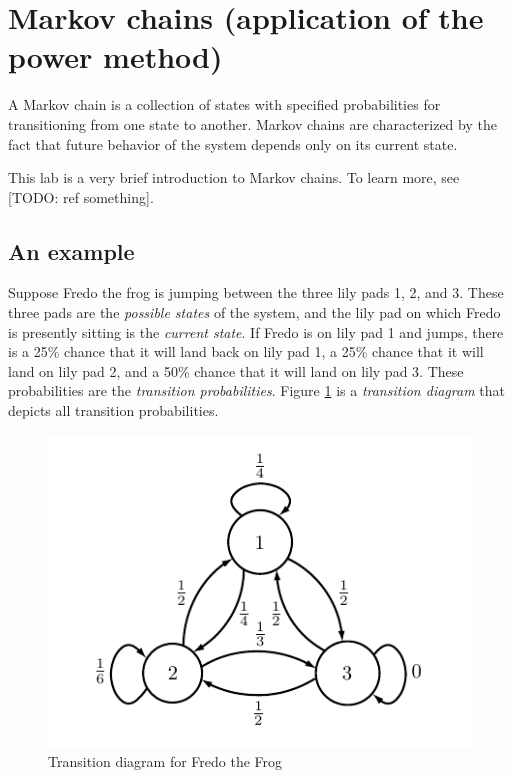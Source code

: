 \section*{Markov chains (application of the power method)}
A Markov chain is a collection of states with specified probabilities for transitioning from one state to another.
Markov chains are characterized by the fact that future behavior of the system depends only on its current state.

This lab is a very brief introduction to Markov chains. To learn more, see [TODO: ref something].

\subsection*{An example}
Suppose Fredo the frog is jumping between the three lily pads 1, 2, and 3.
These three pads are the \emph{possible states} of the system, and the lily pad on which Fredo is presently sitting is the \emph{current state}.
If Fredo is on lily pad 1 and jumps, there is a 25\% chance that it will land back on lily pad 1, a 25\% chance that it will land on lily pad 2, and a 50\% chance that it will land on lily pad 3.
These probabilities are the \emph{transition probabilities}.
Figure \ref{fig:markov1} is a \emph{transition diagram} that depicts all transition probabilities.

\begin{figure}
\includegraphics[width=\textwidth]{markov1}
\caption{Transition diagram for Fredo the Frog}
\label{fig:markov1}
\end{figure}

